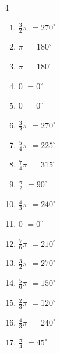 \begin{multicols}{4}
\begin{enumerate}
  \item $\displaystyle \frac{3}{2}\pi$
        $\displaystyle =270^{\circ}$

  \item $\displaystyle \pi$
        $\displaystyle =180^{\circ}$

  \item $\displaystyle \pi$
        $\displaystyle =180^{\circ}$

  \item $\displaystyle 0$
        $\displaystyle =0^{\circ}$

  \item $\displaystyle 0$
        $\displaystyle =0^{\circ}$

  \item $\displaystyle \frac{3}{2}\pi$
        $\displaystyle =270^{\circ}$

  \item $\displaystyle \frac{5}{4}\pi$
        $\displaystyle =225^{\circ}$

  \item $\displaystyle \frac{7}{4}\pi$
        $\displaystyle =315^{\circ}$

  \item $\displaystyle \frac{\pi}{2}$
        $\displaystyle =90^{\circ}$

\columnbreak %

  \item $\displaystyle \frac{4}{3}\pi$
        $\displaystyle =240^{\circ}$

  \item $\displaystyle 0$
        $\displaystyle =0^{\circ}$

  \item $\displaystyle \frac{7}{6}\pi$
        $\displaystyle =210^{\circ}$

  \item $\displaystyle \frac{3}{2}\pi$
        $\displaystyle =270^{\circ}$

  \item $\displaystyle \frac{5}{6}\pi$
        $\displaystyle =150^{\circ}$

  \item $\displaystyle \frac{2}{3}\pi$
        $\displaystyle =120^{\circ}$

  \item $\displaystyle \frac{4}{3}\pi$
        $\displaystyle =240^{\circ}$

  \item $\displaystyle \frac{\pi}{4}$
        $\displaystyle =45^{\circ}$


\end{enumerate}
\end{multicols}
